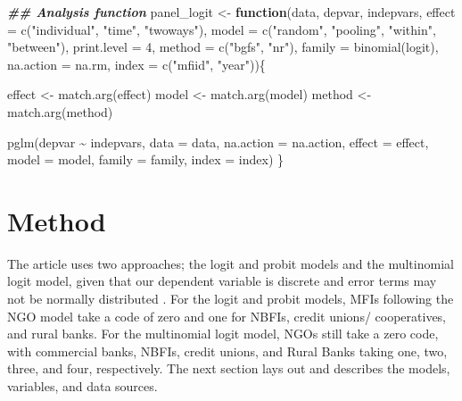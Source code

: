 \documentclass[a4paper,nobind]{templates/ociamthesis}
\newenvironment{Shaded}{\begin{snugshade}}{\end{snugshade}}
\newcommand{\AttributeTok}[1]{\textcolor[rgb]{0.77,0.63,0.00}{#1}}
\newcommand{\ControlFlowTok}[1]{\textcolor[rgb]{0.13,0.29,0.53}{\textbf{#1}}}
\newcommand{\DecValTok}[1]{\textcolor[rgb]{0.00,0.00,0.81}{#1}}
\newcommand{\DocumentationTok}[1]{\textcolor[rgb]{0.56,0.35,0.01}{\textbf{\textit{#1}}}}
\newcommand{\FunctionTok}[1]{\textcolor[rgb]{0.00,0.00,0.00}{#1}}
\newcommand{\NormalTok}[1]{#1}
\newcommand{\OtherTok}[1]{\textcolor[rgb]{0.56,0.35,0.01}{#1}}
\newcommand{\SpecialCharTok}[1]{\textcolor[rgb]{0.00,0.00,0.00}{#1}}
\newcommand{\StringTok}[1]{\textcolor[rgb]{0.31,0.60,0.02}{#1}}
\renewenvironment{Shaded}
{
  \vspace{10pt}%
  \begin{snugshade}%
}{%
  \end{snugshade}%
  \vspace{8pt}%
}
\begin{document}
\begin{Shaded}
\begin{Highlighting}[]
\DocumentationTok{\#\# Analysis function}
\NormalTok{panel\_logit }\OtherTok{\textless{}{-}} \ControlFlowTok{function}\NormalTok{(data, depvar, indepvars,}
                        \AttributeTok{effect =} \FunctionTok{c}\NormalTok{(}\StringTok{"individual"}\NormalTok{, }\StringTok{"time"}\NormalTok{, }\StringTok{"twoways"}\NormalTok{),}
                        \AttributeTok{model =} \FunctionTok{c}\NormalTok{(}\StringTok{"random"}\NormalTok{, }\StringTok{"pooling"}\NormalTok{, }\StringTok{"within"}\NormalTok{, }\StringTok{"between"}\NormalTok{),}
                        \AttributeTok{print.level =} \DecValTok{4}\NormalTok{,}
                        \AttributeTok{method =} \FunctionTok{c}\NormalTok{(}\StringTok{"bgfs"}\NormalTok{, }\StringTok{"nr"}\NormalTok{),}
                        \AttributeTok{family =} \FunctionTok{binomial}\NormalTok{(}\StringTok{\textquotesingle{}logit\textquotesingle{}}\NormalTok{),}
                        \AttributeTok{na.action =}\NormalTok{ na.rm, }
                        \AttributeTok{index =} \FunctionTok{c}\NormalTok{(}\StringTok{"mfiid"}\NormalTok{, }\StringTok{"year"}\NormalTok{))\{}
 
\NormalTok{   effect }\OtherTok{\textless{}{-}} \FunctionTok{match.arg}\NormalTok{(effect)}
\NormalTok{   model }\OtherTok{\textless{}{-}} \FunctionTok{match.arg}\NormalTok{(model)}
\NormalTok{   method }\OtherTok{\textless{}{-}} \FunctionTok{match.arg}\NormalTok{(method)}
   
  \FunctionTok{pglm}\NormalTok{(depvar }\SpecialCharTok{\textasciitilde{}}\NormalTok{ indepvars, }
       \AttributeTok{data =}\NormalTok{ data, }
       \AttributeTok{na.action =}\NormalTok{ na.action, }
       \AttributeTok{effect =}\NormalTok{ effect,}
       \AttributeTok{model =}\NormalTok{ model, }
       \AttributeTok{family =}\NormalTok{ family, }
       \AttributeTok{index =}\NormalTok{ index)}
\NormalTok{\}}
\end{Highlighting}
\end{Shaded}

\hypertarget{method}{%
\section{Method}\label{method}}

The article uses two approaches; the logit and probit models and the multinomial logit model, given that our dependent variable is discrete and error terms may not be normally distributed \autocite{cramer2002origins}. For the logit and probit models, MFIs following the NGO model take a code of zero and one for NBFIs, credit unions/ cooperatives, and rural banks. For the multinomial logit model, NGOs still take a zero code, with commercial banks, NBFIs, credit unions, and Rural Banks taking one, two, three, and four, respectively. The next section lays out and describes the models, variables, and data sources.
\end{document}

